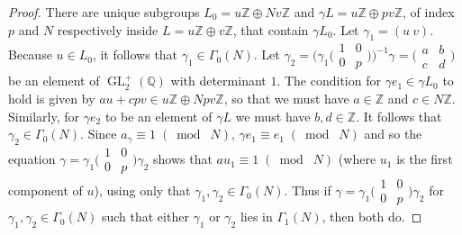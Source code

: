 \documentclass[10pt,leqno,twoside]{article}
\theoremstyle{plain}
\theoremstyle{definition}
\numberwithin{equation}{section}
\numberwithin{lem}{section}
\DeclareMathOperator{\GL}{GL}
\newcommand{\smod}[1]{\;(\bmod\; #1)}
\newcommand{\glqp}{\GL_2^+(\mathbb{Q})}
\begin{document}
\begin{proof}
    There are unique subgroups $L_0 = u\mathbb Z \oplus Nv\mathbb Z$ and $\gamma L = u\mathbb Z\oplus pv\mathbb Z$, of index $p$ and $N$ respectively inside $L = u\mathbb Z\oplus v\mathbb Z$, that contain $\gamma L_0$. Let $\gamma_1 = (u~v)$. Because $u\in L_0$, it follows that $\gamma_1\in\varGamma_0(N)$. Let $\gamma_2 = \big(\gamma_1\big(\!\begin{smallmatrix}
        1 & 0 \\ 0 & p
    \end{smallmatrix}\!\big)\big)^{-1}\gamma = \big(\!\begin{smallmatrix}
        a & b \\ c & d
    \end{smallmatrix}\!\big)$ be an element of $\glqp$ with determinant $1$. The condition for $\gamma e_1 \in\gamma L_0$ to hold is given by $au + cpv\in u\mathbb Z\oplus Npv\mathbb Z$, so that we must have $a\in\mathbb Z$ and $c\in N\mathbb Z$. Similarly, for $\gamma e_2$ to be an element of $\gamma L$ we must have $b,d \in\mathbb Z$. It follows that $\gamma_2\in\varGamma_0(N)$. Since $a_\gamma\equiv 1\smod N$, $\gamma e_1\equiv e_1\smod N$ and so the equation $\gamma = \gamma_1\big(\!\begin{smallmatrix}
        1 & 0 \\ 0 & p
    \end{smallmatrix}\!\big)\gamma_2$ shows that $au_1\equiv 1\smod N$ (where $u_1$ is the first component of $u$), using only that $\gamma_1,\gamma_2\in\varGamma_0(N)$. Thus if $\gamma = \gamma_1\big(\!\begin{smallmatrix}
        1 & 0 \\ 0 & p
    \end{smallmatrix}\!\big)\gamma_2$ for $\gamma_1,\gamma_2\in\varGamma_0(N)$ such that either $\gamma_1$ or $\gamma_2$ lies in $\varGamma_1(N)$, then both do.


\end{proof}
\end{document}
